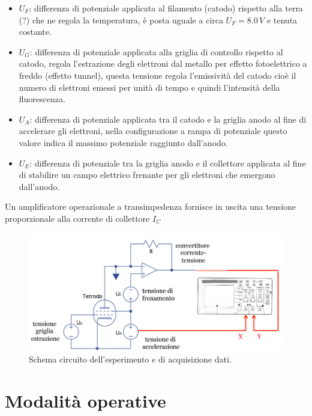 \documentclass[10pt,a4paper]{article}
\begin{document}
\begin{itemize}
\item $U_F$: differenza di potenziale applicata al filamento (catodo) rispetto alla terra (?) che ne regola la temperatura, è posta uguale a circa $U_F = 8.0 \,V$ e tenuta costante.
\item $U_G$: differenza di potenziale applicata alla griglia di controllo rispetto al catodo, regola l'estrazione degli elettroni dal metallo per effetto fotoelettrico a freddo (effetto tunnel), questa tensione regola l'emissività del catodo cioè il numero di elettroni emessi per unità di tempo e quindi l'intensità della fluorescenza.
\item $U_A$: differenza di potenziale applicata tra il catodo e la griglia anodo al fine di accelerare gli elettroni, nella configurazione a rampa di potenziale questo valore indica il massimo potenziale raggiunto dall'anodo.
\item $U_E$: differenza di potenziale tra la griglia anodo e il collettore applicata al fine di stabilire un campo elettrico frenante per gli elettroni che emergono dall'anodo.
\end{itemize}

Un amplificatore operazionale a transimpedenza fornisce in uscita una tensione proporzionale alla corrente di collettore $I_C$

\begin{figure}[!htb]
  \centering
  \includegraphics[scale=.5]{circuito.png}
\caption{Schema circuito dell'esperimento e di acquisizione dati.}
\label{circuito}
\end{figure}


\section{Modalità operative}
\end{document}
